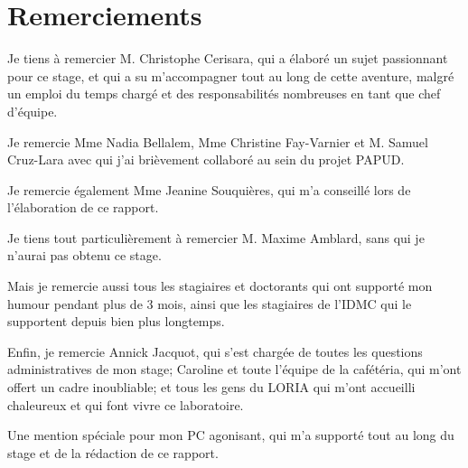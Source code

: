 \maketitle
	
	
\makesecondtitle

\section*{Remerciements}
\pagestyle{empty}
{
	Je tiens à remercier M. Christophe Cerisara, qui a élaboré un sujet passionnant pour ce stage, et qui a su m'accompagner tout au long de cette aventure, malgré un emploi du temps chargé et des responsabilités nombreuses en tant que chef d'équipe.
	
	Je remercie Mme Nadia Bellalem, Mme Christine Fay-Varnier et M. Samuel Cruz-Lara avec qui j'ai brièvement collaboré au sein du projet PAPUD.
	
	Je remercie également Mme Jeanine Souquières, qui m'a conseillé lors de l'élaboration de ce rapport.
	
	Je tiens tout particulièrement à remercier 
	M. Maxime Amblard, sans qui je n'aurai pas obtenu ce stage.
	
	Mais je remercie aussi tous les stagiaires et doctorants qui ont supporté mon humour pendant plus de 3 mois, ainsi que les stagiaires de l'IDMC qui le supportent depuis bien plus longtemps.
	
	Enfin, je remercie Annick Jacquot, qui s'est chargée de toutes les questions administratives de mon stage; Caroline et toute l'équipe de la cafétéria, qui m'ont offert un cadre inoubliable; et tous les gens du LORIA qui m'ont  accueilli chaleureux et qui font vivre ce laboratoire.
	
	Une mention spéciale pour mon PC agonisant, qui m'a supporté tout au long du stage et de la rédaction de ce rapport.
}


